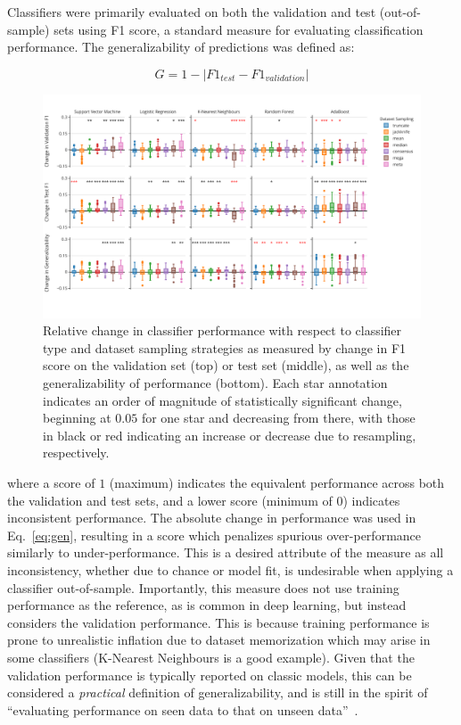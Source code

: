 \documentclass[10pt]{SelfArx} %
\newcommand{\tristanmod}[2]{\colorlet{saved}{.}\color{orange}\sout{#1} #2\color{black}\xspace\color{saved}}
\newcommand{\new}[1]{\color{blue}#1\color{black}\xspace}
\begin{document}
Classifiers were primarily evaluated on both the validation and test (out-of-sample) sets using F1 score, a standard
measure for evaluating classification performance. The generalizability of predictions was defined as:

\begin{equation}
G = 1 - \lvert F1_{test} - F1_{validation} \rvert
\label{eq:gen}
\end{equation}

\begin{figure}[bth!]\centering
\includegraphics[width=\linewidth]{figures/1.pdf}
\caption{Relative change in classifier performance with respect to classifier type and dataset sampling strategies as
measured by change in F1 score on the validation set (top) or test set (middle), as well as the generalizability of
performance (bottom). Each star annotation indicates an order of magnitude of statistically significant change,
beginning at $0.05$ for one star and decreasing from there, with those in black or red indicating an increase or
decrease due to resampling, respectively.}
\label{fig:overall_perf}
\end{figure}

where a score of $1$ (maximum) indicates the equivalent performance across both the validation and test sets, and a
lower score (minimum of $0$) indicates inconsistent performance. The absolute change in performance was used in
Eq.~\ref{eq:gen}, resulting in a score which penalizes spurious over-performance similarly to under-performance. This
is a desired attribute of the measure as all inconsistency, whether due to chance or model fit, is undesirable when
applying a classifier out-of-sample. \new{Importantly, this measure does not use training performance as the reference,
as is common in deep learning, but instead considers the validation performance. This is because training performance
is prone to unrealistic inflation due to dataset memorization which may arise in some classifiers \tristanmod{}{(K-Nearest Neighbours is a good example)}. Given that the
validation performance is typically reported on classic models, this can be considered a \textit{practical} definition
of generalizability, and is still in the spirit of ``evaluating performance on seen data to that on unseen
data''~\cite{shorten2019survey}}.
\end{document}
